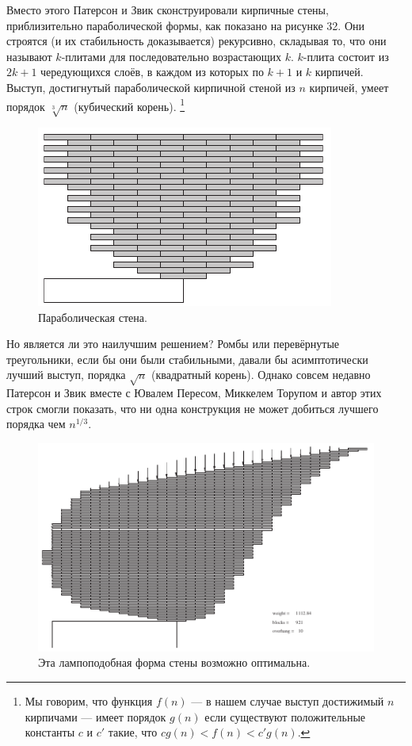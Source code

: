 Вместо этого Патерсон и Звик сконструировали кирпичные стены, приблизительно параболической формы, как показано на рисунке 32.
Они строятся (и их стабильность доказывается) рекурсивно, складывая то, что они называют $k$-плитами для последовательно возрастающих $k$.
$k$-плита состоит из $2k + 1$ чередующихся слоёв, в каждом из которых по $k + 1$ и $k$ кирпичей.
Выступ, достигнутый параболической кирпичной стеной из $n$ кирпичей, умеет порядок $\sqrt[3]{n}$ (кубический корень).%
\footnote{Мы говорим, что функция $f (n)$ --- в нашем случае выступ достижимый $n$ кирпичами --- имеет порядок $g(n)$ если существуют положительные константы $c$ и $c'$ такие, что $cg(n) < f (n) < c' g(n)$.}

\begin{figure}[htb!]
\centering
\includegraphics[scale=1]{pics/kirpich7}
\caption{Параболическая стена.}
\label{pic:kirpich7}
\end{figure}

Но является ли это наилучшим решением?
Ромбы или перевёрнутые треугольники, если бы они были стабильными, давали бы асимптотически лучший выступ, порядка $\sqrt{n}$ (квадратный корень).
Однако совсем недавно Патерсон и Звик вместе с Ювалем Пересом, Миккелем Торупом и автор этих строк \cite{48} смогли показать, что ни одна конструкция не может добиться лучшего порядка чем $n^{1/3}$.

\begin{figure}[htb!]
\centering
\includegraphics[scale=1]{pics/kirpich8}
\caption{Эта лампоподобная форма стены возможно оптимальна.}
\label{pic:kirpich8}
\end{figure}

